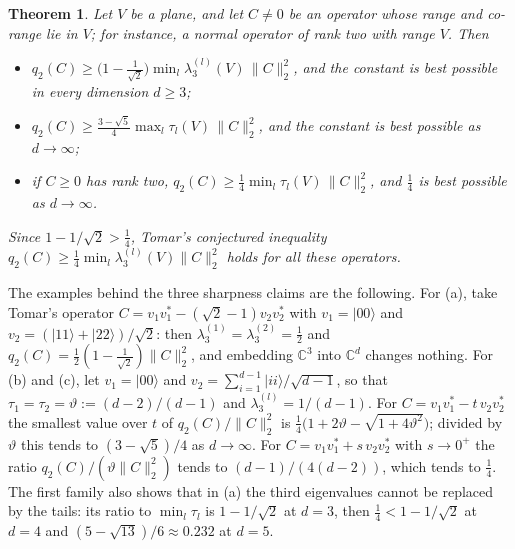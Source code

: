 \documentclass[11pt]{article}
\newtheorem{theorem}{Theorem}
\theoremstyle{remark}
\newcommand{\norm}[1]{\lVert #1\rVert}
\begin{document}
\begin{theorem}\label{thm:normal}
Let $V$ be a plane, and let $C\ne0$ be an operator whose range and co-range lie in $V$; for instance, a normal operator of
rank two with range $V$. Then
\begin{itemize}
\item[(a)] $q_2(C)\ge\big(1-\frac1{\sqrt2}\big)\min_l\lambda_3^{(l)}(V)\,\norm{C}_2^2$, and the constant is best possible
in every dimension $d\ge3$;
\item[(b)] $q_2(C)\ge\frac{3-\sqrt5}4\max_l\tau_l(V)\,\norm{C}_2^2$, and the constant is best possible as $d\to\infty$;
\item[(c)] if $C\ge0$ has rank two, $q_2(C)\ge\frac14\min_l\tau_l(V)\,\norm{C}_2^2$, and $\frac14$ is best possible as
$d\to\infty$.
\end{itemize}
Since $1-1/\sqrt2>\frac14$, Tomar's conjectured inequality $q_2(C)\ge\frac14\min_l\lambda_3^{(l)}(V)\norm{C}_2^2$ holds
for all these operators.
\end{theorem}

The examples behind the three sharpness claims are the following. For (a), take Tomar's operator
$C=v_1v_1^*-(\sqrt2-1)v_2v_2^*$ with $v_1=|00\rangle$ and $v_2=(|11\rangle+|22\rangle)/\sqrt2$: then
$\lambda_3^{(1)}=\lambda_3^{(2)}=\frac12$ and $q_2(C)=\frac12(1-\frac1{\sqrt2})\norm{C}_2^2$, and embedding $\mathbb C^3$
into $\mathbb C^d$ changes nothing. For (b) and (c), let $v_1=|00\rangle$ and $v_2=\sum_{i=1}^{d-1}|ii\rangle/\sqrt{d-1}$,
so that $\tau_1=\tau_2=\vartheta:=(d-2)/(d-1)$ and $\lambda_3^{(l)}=1/(d-1)$. For $C=v_1v_1^*-t\,v_2v_2^*$ the smallest
value over $t$ of $q_2(C)/\norm{C}_2^2$ is $\frac14\big(1+2\vartheta-\sqrt{1+4\vartheta^2}\big)$; divided by $\vartheta$
this tends to $(3-\sqrt5)/4$ as $d\to\infty$. For $C=v_1v_1^*+s\,v_2v_2^*$ with $s\to0^+$ the ratio
$q_2(C)/(\vartheta\norm{C}_2^2)$ tends to $(d-1)/(4(d-2))$, which tends to $\frac14$. The first family also shows that
in (a) the third eigenvalues cannot be replaced by the tails: its ratio to $\min_l\tau_l$ is $1-1/\sqrt2$ at $d=3$, then
$\frac14<1-1/\sqrt2$ at $d=4$ and $(5-\sqrt{13})/6\approx0.232$ at $d=5$.
\end{document}
